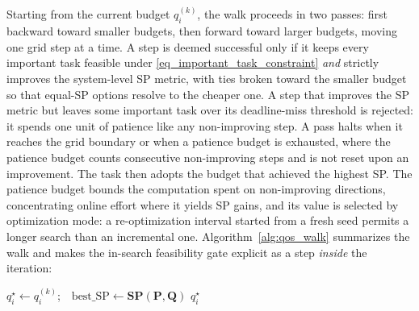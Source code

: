     Starting from the current budget $q_i^{(k)}$, the walk proceeds in two passes: first backward toward smaller budgets, then forward toward larger budgets, moving one grid step at a time.
    A step is deemed successful only if it keeps every important task feasible under \eqref{eq_important_task_constraint} \emph{and} strictly improves the system-level SP metric, 
    with ties broken toward the smaller budget so that equal-SP options resolve to the cheaper one.
    A step that improves the SP metric but leaves some important task over its deadline-miss threshold is rejected: 
    it spends one unit of patience like any non-improving step.
    A pass halts when it reaches the grid boundary or when a patience budget is exhausted, where the patience budget counts consecutive non-improving steps and is not reset upon an improvement.
    The task then adopts the budget that achieved the highest SP.
    The patience budget bounds the computation spent on non-improving directions, concentrating online effort where it yields SP gains, and its value is selected by optimization mode:
    a re-optimization interval started from a fresh seed permits a longer search than an incremental one.
    Algorithm~\ref{alg:qos_walk} summarizes the walk and makes the in-search feasibility gate explicit as a step \emph{inside} the iteration: 
    \begin{algorithm}[htbp]
        \caption{QoS-Budget Trial-and-Error Walk for one $\tau^Q_i$} \label{alg:qos_walk}
        $q_i^\star \leftarrow q_i^{(k)}$;\ \ $\text{best\_SP} \leftarrow \textbf{SP}(\boldsymbol{P},\boldsymbol{Q})$ 
        \KwRet $q_i^\star$
    \end{algorithm}

